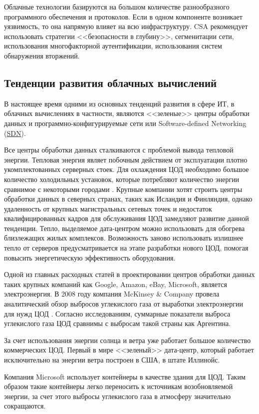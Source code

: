 Облачные технологии базируются на большом количестве разнообразного программного обеспечения и протоколов.
Если в одном компоненте возникает уязвимость, то она напрямую влияет на всю инфраструктуру.
CSA рекомендует использовать стратегии <<безопасности в глубину>>, сегменитации сети, использования многофакторной аутентификации, использования систем обнаружения вторжений.

\subsection{Тенденции развития облачных вычислений}

В настоящее время одними из основных тенденций развития в сфере ИТ, в облачных вычислениях в частности, являются <<зеленые>> центры обработки данных и программно-конфигурируемые сети или Software-defined Networking (\hyperlink{sdn}{SDN}).

Все центры обработки данных сталкиваются с проблемой вывода тепловой энергии.
Тепловая энергия являет побочным действием от эксплуатации плотно укомплектованных серверных стоек.
Для охлаждения ЦОД необходимо большое количество холодильных установок, которые потребляют количество энергии сравнимое с некоторыми городами \cite{cnewsdc}.
Крупные компании хотят строить центры обработки данных в северных странах, таких как Исландия и Финляндия, однако удаленность от крупных магистральных сетевых точек и недостаток квалифицированных кадров для обслуживания ЦОД замедляют развитие данной тенденции.
Тепло, выделяемое дата-центром можно использовать для обогрева близлежащих жилых комплексов.
Возможность заново использовать излишнее тепло от серверов предусматривается на этапе разработки нового ЦОД, помогая повысить энергетическую эффективность оборудования.

Одной из главных расходных статей в проектировании центров обработки данных таких крупных компаний как Google, Amazon, eBay, Microsoft, является электроэнергия.
В 2008 году компания McKinsey \& Company провела аналитический обзор выбросов углекислого газа от выработки электроэнергии для нужд ЦОД \cite{greendc}.
Согласно исследованиям, суммарные показатели выброса углекислого газа ЦОД сравнимы с выбросам такой страны как Аргентина.

За счет использования энергии солнца и ветра уже работает большое количество коммерческих ЦОД.
Первый в мире <<зеленый>> дата-центр, который работает исключительно на энергии ветра построен в США, в штате Иллинойс.

Компания Microsoft использует контейнеры в качестве здания для ЦОД.
Таким образом такие контейнеры легко переносить к источникам возобновляемой энергии, за счет этого выбросы углекислого газа в атмосферу значительно сокращаются.

